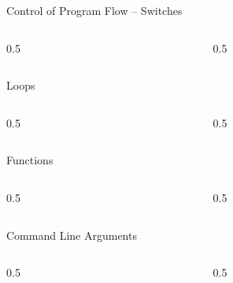 \documentclass[aspectratio=1610]{beamer}
\begin{document}
\begin{frame}{Control of Program Flow -- Switches}
\begin{columns}[c]
  \begin{column}{0.5\textwidth}
    
  \end{column}
  \begin{column}{0.5\textwidth}
    
  \end{column}
\end{columns}
\end{frame}

\begin{frame}{Loops}
\begin{columns}[c]
  \begin{column}{0.5\textwidth}
    
  \end{column}
  \begin{column}{0.5\textwidth}
    
  \end{column}
\end{columns}
\end{frame}

\begin{frame}{Functions}
\begin{columns}[c]
  \begin{column}{0.5\textwidth}
    
  \end{column}
  \begin{column}{0.5\textwidth}
    
  \end{column}
\end{columns}
\end{frame}




\begin{frame}{Command Line Arguments}
\begin{columns}[c]
  \begin{column}{0.5\textwidth}
    
  \end{column}
  \begin{column}{0.5\textwidth}
    
  \end{column}
\end{columns}
\end{frame}
\end{document}
